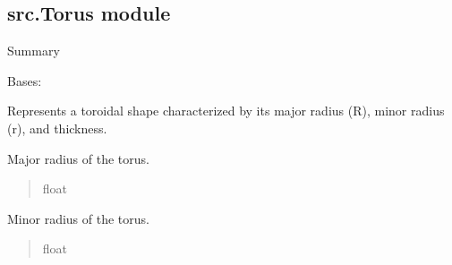 \documentclass[letterpaper,10pt,english]{sphinxmanual}
\begin{document}
\subsection{src.Torus module}
\label{\detokenize{src:module-src.Torus}}\label{\detokenize{src:src-torus-module}}
\sphinxAtStartPar
Summary

\begin{fulllineitems}
\label{\detokenize{src:src.Torus.Torus}}
\pysigstartsignatures
{}
\pysigstopsignatures
\sphinxAtStartPar
Bases: 

\sphinxAtStartPar
Represents a toroidal shape characterized by its major radius (R), minor radius (r), and thickness.

\begin{fulllineitems}
\label{\detokenize{src:src.Torus.Torus.R}}
\pysigstartsignatures
{}
\pysigstopsignatures
\sphinxAtStartPar
Major radius of the torus.
\begin{quote}\begin{description}
\sphinxAtStartPar
float

\end{description}\end{quote}

\end{fulllineitems}


\begin{fulllineitems}
\label{\detokenize{src:src.Torus.Torus.r}}
\pysigstartsignatures
{}
\pysigstopsignatures
\sphinxAtStartPar
Minor radius of the torus.
\begin{quote}\begin{description}
\sphinxAtStartPar
float


\end{description}
\end{quote}
\end{fulllineitems}
\end{fulllineitems}
\end{document}

